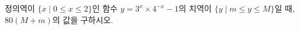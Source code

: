 정의역이 $\{x \mid 0\le x\le 2\}$인 함수 $y=3^x\times 4^{-x}-1$의 치역이 $\{y \mid m\le y\le M\}$일 때, $80(M+m)$의 값을 구하시오.
